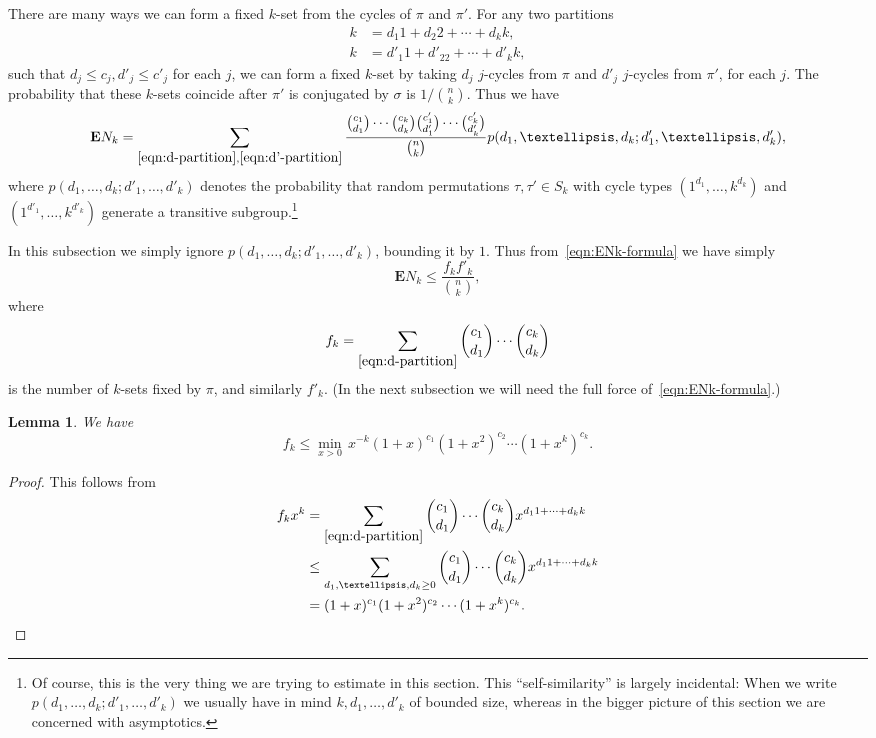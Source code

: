 \documentclass[10pt,a4paper]{amsart}
\newtheorem{lemma}[theorem]{Lemma}
\theoremstyle{remark}
\newcommand\E{\mathbf{E}}
\begin{document}
There are many ways we can form a fixed $k$-set from the cycles of $\pi$ and $\pi'$. For any two partitions
\begin{align}
 k &= d_1 1 + d_2 2 + \cdots + d_k k, \label{eqn:d-partition}\\
 k &= d'_1 1 + d'_22 + \cdots + d'_k k, \label{eqn:d'-partition}
\end{align}
such that $d_j \leq c_j, d'_j \leq c'_j$ for each $j$, we can form a fixed $k$-set by taking $d_j$ $j$-cycles from $\pi$ and $d'_j$ $j$-cycles from $\pi'$, for each $j$. The probability that these $k$-sets coincide after $\pi'$ is conjugated by $\sigma$ is $1 / \binom{n}{k}$. Thus we have
\begin{equation} \label{eqn:ENk-formula}
 \E N_k = \sum_{\eqref{eqn:d-partition}, \eqref{eqn:d'-partition}} \frac{\binom{c_1}{d_1} \cdots \binom{c_k}{d_k} \binom{c'_1}{d'_1} \cdots \binom{c'_k}{d'_k}}{\binom{n}{k}} p(d_1, \dots, d_k ; d'_1, \dots, d'_k),
\end{equation}
where $p(d_1, \dots, d_k ; d'_1, \dots, d'_k)$ denotes the probability that random permutations $\tau, \tau' \in S_k$ with cycle types $(1^{d_1}, \dots, k^{d_k})$ and $(1^{d'_1}, \dots, k^{d'_k})$ generate a transitive subgroup.\footnote{Of course, this is the very thing we are trying to estimate in this section. This ``self-similarity'' is largely incidental: When we write $p(d_1, \dots, d_k ; d'_1, \dots, d'_k)$ we usually have in mind $k, d_1, \dots, d'_k$ of bounded size, whereas in the bigger picture of this section we are concerned with asymptotics.}

In this subsection we simply ignore $p(d_1, \dots, d_k ; d'_1, \dots, d'_k)$, bounding it by $1$. Thus from~\eqref{eqn:ENk-formula} we have simply
\[
 \E N_k \leq \frac{ f_k f'_k }{\binom{n}{k}},
\]
where
\begin{equation}\label{fk}
 f_k = \sum_{\eqref{eqn:d-partition}} \binom{c_1}{d_1} \cdots \binom{c_k}{d_k}
\end{equation}
is the number of $k$-sets fixed by $\pi$, and similarly $f'_k$. (In the next subsection we will need the full force of~\eqref{eqn:ENk-formula}.)

\begin{lemma} \label{lem:fkx-bound}
We have
\[
 f_k \leq \min_{x > 0}\, x^{-k} (1+x)^{c_1} (1+x^2)^{c_2} \cdots (1+x^k)^{c_k}.
\]
\end{lemma}
\begin{proof}
This follows from
\begin{align*}
 f_k x^k
 &= \sum_{\eqref{eqn:d-partition}} \binom{c_1}{d_1} \cdots \binom{c_k}{d_k} x^{d_1 1 + \cdots + d_k k} \\
 &\leq \sum_{d_1, \dots, d_k\geq 0} \binom{c_1}{d_1} \cdots \binom{c_k}{d_k} x^{d_1 1 + \cdots + d_k k} \\
 &= (1+x)^{c_1} (1+x^2)^{c_2} \cdots (1+x^k)^{c_k}.\qedhere
\end{align*}
\end{proof}
\end{document}
